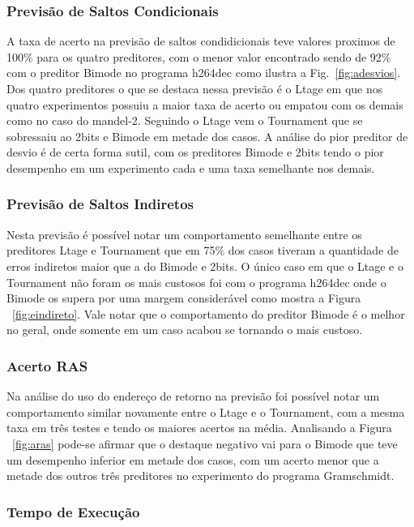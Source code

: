 \documentclass[12pt]{article}
\begin{document}
\subsubsection{Previsão de Saltos Condicionais}

A taxa de acerto na previsão de saltos condidicionais teve valores proximos de 100\% para os quatro preditores, com o menor valor encontrado sendo de 92\% com o preditor Bimode no programa h264dec como ilustra a Fig.~\ref{fig:adesvios}. Dos quatro preditores o que se destaca nessa previsão é o Ltage em que nos quatro experimentos possuiu a maior taxa de acerto ou empatou com os demais como no caso do mandel-2. Seguindo o Ltage vem o Tournament que se sobressaiu ao 2bits e Bimode em metade dos casos. A análise do pior preditor de desvio é de certa forma sutil, com os preditores Bimode e 2bits tendo o pior desempenho em um experimento cada e uma taxa semelhante nos demais.

\subsubsection{Previsão de Saltos Indiretos}

Nesta previsão é possível notar um comportamento semelhante entre os preditores Ltage e Tournament que em 75\% dos casos tiveram a quantidade de erros indiretos maior que a do Bimode e 2bits. O único caso em que o Ltage e o Tournament não foram os mais custosos foi com o programa h264dec onde o Bimode os supera por uma margem considerável como mostra a Figura ~\ref{fig:eindireto}. Vale notar que o comportamento do preditor Bimode é o melhor no geral, onde somente em um caso acabou se tornando o mais custoso.

\subsubsection{Acerto RAS}

Na análise do uso do endereço de retorno na previsão foi possível notar um comportamento similar novamente entre o Ltage e o Tournament, com a mesma taxa em três testes e tendo os maiores acertos na média. Analisando a Figura ~\ref{fig:aras} pode-se afirmar que o destaque negativo vai para o Bimode que teve um desempenho inferior em metade dos casos, com um acerto menor que a metade dos outros três preditores no experimento do programa Gramschmidt. 

\subsubsection{Tempo de Execução}
\end{document}
